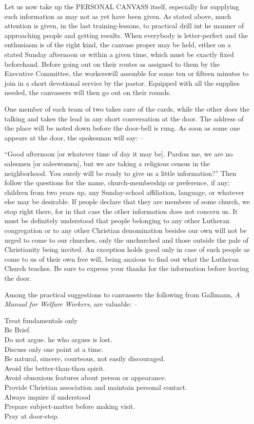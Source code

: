 \documentclass[
]{book}
\begin{document}
Let us now take up the PERSONAL CANVASS itself, especially for supplying such information as may not as yet have been given. As stated above, much attention is given, in the last training-lessons, to practical drill int he manner of approaching people and getting results. When everybody is letter-perfect and the enthusiasm is of the right kind, the canvass proper may be held, either on a stated Sunday afternoon or within a given time, which must be exactly fixed beforehand. Before going out on their routes as assigned to them by the Executive Committee, the workerswill assemble for some ten or fifteen minutes to join in a short devotional service by the pastor. Equipped with all the supplies needed, the canvassers will then go out on their rounds.

One member of each team of two takes care of the cards, while the other does the talking and takes the lead in any short conversation at the door. The address of the place will be noted down before the door-bell is rung. As soon as some one appears at the door, the spokesman will say: --

``Good afternoon {[}or whatever time of day it may be{]}. Pardon me, we are no salesmen {[}or saleswomen{]}, but we are taking a religious census in the neighborhood. You surely will be ready to give us a little information?'' Then follow the questions for the name, church-membership or preference, if any; children from two years up, any Sunday-school affiliation, language, or whatever else may be desirable. If people declare that they are members of some church, we stop right there, for in that case the other information does not concern us. It must be definitely understood that people belonging to any other Lutheran congregation or to any other Christian denomination besides our own will not be urged to come to our churches, only the unchurched and those outside the pale of Christianity being invited. An exception holds good only in case of such people as come to us of their own free will, being anxious to find out what the Lutheran Church teaches. Be sure to express your thanks for the information before leaving the door.

Among the practical suggestions to canvassers the following from Gallmann, \emph{A Manual for Welfare Workers}, are valuable: --

Treat fundamentals only\\
Be Brief.\\
Do not argue. he who argues is lost.\\
Discuss only one point at a time.\\
Be natural, sincere, courteous, not easily discouraged.\\
Avoid the better-than-thou spirit.\\
Avoid obnoxious features about person or appearance.\\
Provide Christian association and maintain personal contact.\\
Always inquire if understood\\
Prepare subject-matter before making visit.\\
Pray at door-step.
\end{document}
